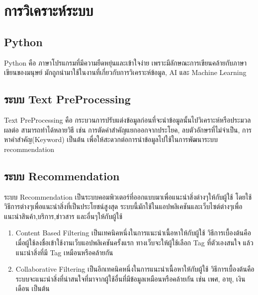 \section{การวิเคราะห์ระบบ}
\subsection{Python}
Python คือ ภาษาโปรแกรมที่มีความยืดหยุ่นและเข้าใจง่าย เพราะมีลักษณะการเขียนคล้ายกับภาษาเขียนของมนุษย์ มักถูกนำมาใช้ในงานที่เกี่ยวกับการวิเคราะห์ข้อมูล, AI และ Machine Learning 
\cite{python}
\subsection{ระบบ Text PreProcessing}
Text PreProcessing คือ กระบวนการปรับแต่งข้อมูลก่อนที่จะนำข้อมูลนั้นไปวิเคราะห์หรือประมวลผลต่อ สามารถทำได้หลายวิธี เช่น การตัดคำสำคัญแยกออกจากประโยค, ลบตัวอักษรที่ไม่จำเป็น, การหาคำสำคัญ(Keyword) เป็นต้น เพื่อให้สะดวกต่อการนำข้อมูลไปใช้ในการพัฒนาระบบ recommendation
\cite{prepros}

\subsection{ระบบ Recommendation}
ระบบ Recommendation เป็นระบบคอมพิวเตอร์ที่ออกแบบมาเพื่อแนะนำสิ่งต่างๆให้กับผู้ใช้ โดยใช้วิธีการต่างๆเพื่อแนะนำสิ่งที่เป็นประโยชน์สูงสุด ระบบนี้มักใช้ในแอปพลิเคชันและเว็บไซต์ต่างๆเพื่อแนะนำสินค้า,บริการ,ข่าวสาร และอื่นๆให้กับผู้ใช้
\cite{recom}
\begin{enumerate}
    \item Content Based Filtering เป็นเทคนิคหนึ่งในการแนะนำเนื้อหาให้กับผู้ใช้ วิธีการเบื้องต้นคือ เมื่อผู้ใช้ลงชื่อเข้าใช้งานเว็บแอปพลิเคชันครั้งแรก ทางเว็บจะให้ผู้ใช้เลือก Tag ที่ตัวเองสนใจ แล้วแนะนำสิ่งที่มี Tag เหมือนหรือคล้ายกัน
    \item Collaborative Filtering เป็นอีกเทคนิคหนึ่งในการแนะนำเนื้อหาให้กับผู้ใช้ วิธีการเบื้องต้นคือ ระบบจะแนะนำสิ่งที่น่าสนใจที่มาจากผู้ใช้อื่นที่มีข้อมูลเหมือนหรือคล้ายกัน เช่น เพศ, อายุ, เงินเดือน เป็นต้น 
\end{enumerate}



